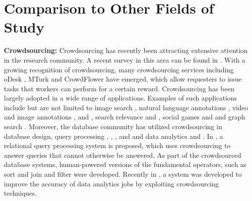 \documentclass{USC-Thesis}
\numberwithin{equation}{chapter}
\begin{document}
\section{Comparison to Other Fields of Study}
\textbf{Crowdsourcing:} Crowdsourcing has recently been attracting extensive attention in the research community. A recent survey in this area can be found in \cite{kittur2013future}. With a growing recognition of crowdsourcing, many crowdsourcing services including oDesk \cite{odesk}, MTurk \cite{mturk} and CrowdFlower \cite{Crowdflower} have emerged, which allow requesters to issue tasks that workers can perform for a certain reward. Crowdsourcing has been largely adopted in a wide range of applications. Examples of such applications include but are not limited to image search \cite{yan2010crowdsearch}, natural language annotations \cite{snow2008cheap}, video and image annotations \cite{chen2009crowdsourceable}, \cite{sorokin2008utility} and \cite{whitehill2009whose}, search relevance \cite{alonso2008crowdsourcing} and \cite{bozzon2012answering}, social games \cite{von2008designing} and \cite{guy2011guess} and graph search \cite{parameswaran2011human}. Moreover, the database community has utilized crowdsourcing in database design, query processing \cite{franklin2011crowddb}, \cite{marcus2011human}, \cite{parameswaran2012crowdscreen}, \cite{demartini2013crowdq} and \cite{zhao2013crowdseed} and data analytics \cite{liu2012cdas} and \cite{wang2012crowder}. In \cite{franklin2011crowddb}, a relational query processing system is proposed, which uses crowdsourcing to answer queries that cannot otherwise be answered. As part of the crowdsourced database systems, human-powered versions of the fundamental operators, such as sort and join \cite{marcus2011human} and filter \cite{parameswaran2012crowdscreen} were developed. Recently in \cite{liu2012cdas}, a system was developed to improve the accuracy of data analytics jobs by exploiting crowdsourcing techniques.

\end{document}
